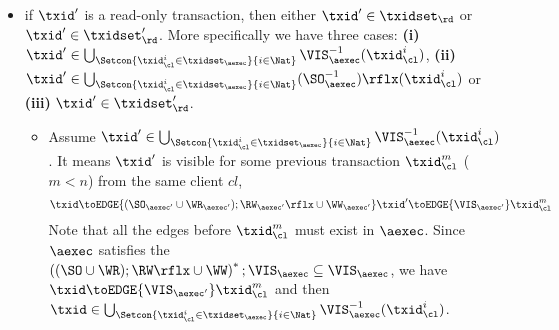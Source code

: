 \begin{itemize}
\begin{itemize}
\begin{itemize}
        Recall the \( \dagger \) is defined as the following:
        \begin{equation}
        \label{equ:cp-dagger}
        \dagger  \equiv 
            \fora{\key, \key', i, j}
                i \in \vi(\key)  \wedge \wtOf(\mkvs(\key', j)) \toEDGE{(((\SO \cup \WR_{\mkvs}) ; \RW_{\mkvs}\rflx) \cup \WW_{\mkvs})^{+}} \wtOf(\mkvs(\key, i))
            \implies j \in \vi(\key')  
        \end{equation}
        Since \( \WR_\mkvs \), \( \WW_\mkvs \) and \( \RW_\mkvs \) coincide with
        \( \WR_\aexec \), \( \WW_\aexec \) and \( \RW_\aexec \) respectively.
        Also because \( \txid \) write to at least one key,
        it is easy to see there exists some version \( \key'',m\) such that 
        \( \txid = \wtOf(\mkvs(\key'',m))\) and \( m \in \vi(\key'')\).
        By definition of \( \Tx \), it follows \( \txid \in \Tx(\mkvs, \vi) \).
        \item if \( \txid \) is a read-only transaction, we add it into \( \txidset'_\rd \).
    \end{itemize}
    \item 
    if \( \txid' \) is a read-only transaction, then either \( \txid' \in \txidset_\rd \) or \( \txid' \in \txidset'_\rd \).
    More specifically we have three cases: \textbf{(i)} \( \txid' \in \bigcup_{\Setcon{\txid_{\cl}^{i} \in \txidset_{\aexec} }{ i \in \Nat }} \VIS_{\aexec}^{-1}(\txid^i_\cl) \), \textbf{(ii)} \( \txid' \in \bigcup_{\Setcon{\txid_{\cl}^{i} \in \txidset_{\aexec} }{ i \in \Nat }} (\SO_{\aexec}^{-1})\rflx(\txid^i_\cl) \) or \textbf{(iii)} \( \txid' \in \txidset'_\rd\).
    \begin{itemize}
        \item
            Assume \( \txid' \in \bigcup_{\Setcon{\txid_{\cl}^{i} \in \txidset_{\aexec} }{ i \in \Nat }} \VIS_{\aexec}^{-1}(\txid^i_\cl) \).
        It means \( \txid' \) is visible for some previous transaction \( \txid_\cl^m \) (\( m < n \)) from the same client \( cl \), 
        \ie 
        \[ 
            \txid \toEDGE{(\SO_{\aexec'} \cup \WR_{\aexec'} ) ; \RW_{\aexec'}\rflx \cup \WW_{\aexec'}} \txid' \toEDGE{\VIS_{\aexec'}}  \txid_\cl^m 
        \]
        Note that all the edges before \( \txid_\cl^m \) must exist in \( \aexec \).
        Since \( \aexec \) satisfies the \( \left( (\SO \cup \WR ) ; \RW\rflx \cup \WW \right)^* ; \VIS_\aexec \subseteq \VIS_\aexec \),
        we have \( \txid \toEDGE{\VIS_{\aexec'}} \txid_\cl^m \) and then \( \txid \in \bigcup_{\Setcon{\txid_{\cl}^{i} \in \txidset_{\aexec} }{ i \in \Nat }} \VIS_{\aexec}^{-1}(\txid^i_\cl)\).

\end{itemize}
\end{itemize}
\end{itemize}
